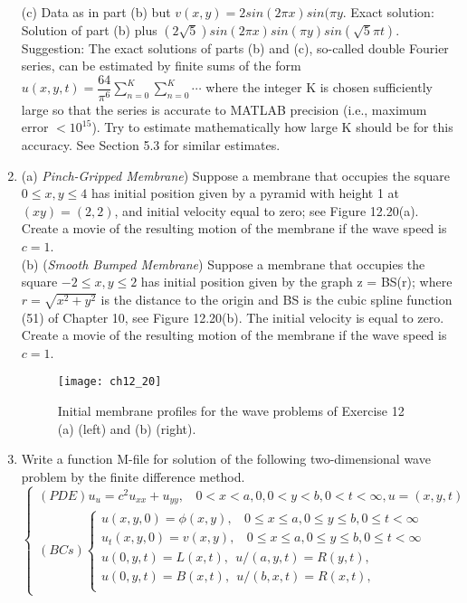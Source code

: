 \documentclass[../main.tex]{subfiles}
\begin{document}
\begin{enumerate}
(c) Data as in part (b) but $v(x,y)=2 sin (2\pi x)sin(\pi y$. Exact solution: Solution of part (b) 
plus $(2\sqrt{5})sin(2\pi x)sin(\pi y)sin(\sqrt{5}\pi t)$.
\\
Suggestion: The exact solutions of parts (b) and (c), so-called double Fourier series, can be estimated by finite sums of the form 
$u(x,y,t)=\dfrac{64}{\pi^6} \sum_{n=0}^{K} \sum_{n=0}^{K} \cdots$
where the integer K is chosen sufficiently large so that the series is accurate to MATLAB precision (i.e., maximum error $< 10^{15}$). Try to estimate mathematically how large K should be for this accuracy. See Section 5.3 for similar estimates.
	\item
		(a) \textit{Pinch-Gripped Membrane}) Suppose a membrane that occupies the square $0 \leqslant x,y \leqslant 4$ has initial position given by a pyramid with height 1 at $(xy) = (2,2)$, and initial velocity equal to zero; see Figure 12.20(a). Create a movie of the resulting motion of the membrane if the wave 
speed is $c = 1$.
\\
(b) (\textit{Smooth Bumped Membrane})
Suppose a membrane that occupies the square $-2 \leqslant x,y \leqslant 2 $
has initial position given by the graph z = BS(r); where $r = \sqrt{x^2+ y^2}$ is the distance to the origin and BS is the cubic spline function (51) of Chapter 10, see Figure 12.20(b). The initial velocity is equal to zero. Create a movie of the resulting motion of the membrane if the wave speed is $c = 1$.
\begin{figure}[H]
	\centering
	\texttt{[image: ch12\_20]}
	\caption{\textsf{Initial membrane profiles for the wave problems of Exercise 12 (a) (left) and (b) 
(right).}}
	\label{pfig:ch12_20}
\end{figure}
	\item
		Write a function M-file for solution of the following two-dimensional wave problem by the 
finite difference method. 
$$\begin{cases} 
	(PDE) u_u=c^2 u_{xx}+u_{yy},~~~~0<x<a,0, 0<y<b,0<t<\infty,u=(x,y,t)\\
(BCs)
		\begin{cases}
		u(x,y,0)=\phi(x,y), ~~~~ 0\leqslant x \leqslant a,0\leqslant y \leqslant b, 0 \leqslant t< \infty \\
		u_t(x,y,0)=v(x,y), ~~~~ 0\leqslant x \leqslant a,0\leqslant y \leqslant b, 0 \leqslant t< \infty \\
		 u(0,y,t)=L(x,t),~~u/(a,y,t)=R(y,t),\\
		 u(0,y,t)=B(x,t),~~u/(b,x,t)=R(x,t),\\

\end{cases}
\end{cases}$$
\end{enumerate}
\end{document}
